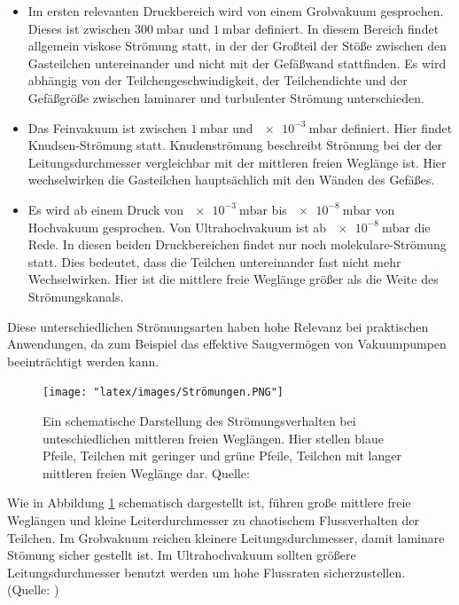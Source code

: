 		\begin{itemize}
			\item
			Im ersten relevanten Druckbereich wird von einem Grobvakuum gesprochen. Dieses ist zwischen $\SI{300}{\milli\bar}$ und $\SI{1}{\milli\bar}$ definiert.
			In diesem Bereich findet allgemein viskose Strömung statt, in der der Großteil der Stöße zwischen den Gasteilchen untereinander und nicht mit der Gefäßwand stattfinden.
			Es wird abhängig von der Teilchengeschwindigkeit, der Teilchendichte und der Gefäßgröße zwischen laminarer und turbulenter Strömung unterschieden. 

			\item
			Das Feinvakuum ist zwischen $\SI{1}{\milli\bar}$ und $\SI{e-3}{\milli\bar}$ definiert. Hier findet Knudsen-Strömung statt.
			Knudenströmung beschreibt Strömung bei der der Leitungsdurchmesser vergleichbar mit der mittleren freien Weglänge ist.
			Hier wechselwirken die Gasteilchen hauptsächlich mit den Wänden des Gefäßes.

			\item
			Es wird ab einem Druck von $\SI{e-3}{\milli\bar}$ bis $\SI{e-8}{\milli\bar}$ von Hochvakuum gesprochen. Von Ultrahochvakuum ist ab $\SI{e-8}{\milli\bar}$ die Rede.	
			In diesen beiden Druckbereichen findet nur noch molekulare-Strömung statt.
			Dies bedeutet, dass die Teilchen untereinander fast nicht mehr Wechselwirken. 
			Hier ist die mittlere freie Weglänge größer als die Weite des Strömungskanals.
		\end{itemize}
		Diese unterschiedlichen Strömungsarten haben hohe Relevanz bei praktischen Anwendungen, da zum Beispiel das effektive Saugvermögen von Vakuumpumpen beeinträchtigt werden kann.
		\begin{figure}
			\centering
			\texttt{[image: "latex/images/Strömungen.PNG"]}
			\caption{Ein schematische Darstellung des Strömungsverhalten bei unteschiedlichen mittleren freien Weglängen.
				 Hier stellen blaue Pfeile, Teilchen mit geringer und grüne Pfeile, Teilchen mit langer mittleren freien Weglänge dar. \protect Quelle: \cite{pfeiffer:pump}}
			\label{fig:stroe}
		\end{figure}  
		Wie in Abbildung \ref{fig:stroe} schematisch dargestellt ist, führen große mittlere freie Weglängen und kleine Leiterdurchmesser zu chaotischem Flussverhalten der Teilchen.
		Im Grobvakuum reichen kleinere Leitungsdurchmesser, damit laminare Stömung sicher gestellt ist.
		Im Ultrahochvakuum sollten größere Leitungsdurchmesser benutzt werden um hohe Flussraten sicherzustellen.\\
		(Quelle: \cite{pfeiffer:grund})

